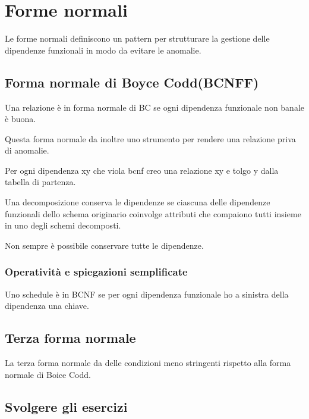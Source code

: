 \section{Forme normali}

Le forme normali definiscono un pattern per strutturare la gestione delle dipendenze funzionali in modo da evitare le anomalie.

\subsection{Forma normale di Boyce Codd(BCNFF)}

Una relazione è in forma normale di BC se ogni dipendenza funzionale non banale è buona.

Questa forma normale da inoltre uno strumento per rendere una relazione priva di anomalie.

Per ogni dipendenza xy che viola bcnf creo una relazione xy e tolgo y dalla tabella di partenza.

Una decomposizione conserva le dipendenze se ciascuna delle dipendenze funzionali dello schema originario coinvolge attributi che compaiono tutti insieme in uno degli schemi decomposti.

Non sempre è possibile conservare tutte le dipendenze.

\subsubsection{Operatività e spiegazioni semplificate}

Uno schedule è in BCNF se per ogni dipendenza funzionale ho a sinistra della dipendenza una chiave.

\subsection{Terza forma normale}

La terza forma normale da delle condizioni meno stringenti rispetto alla forma normale di Boice Codd.

\subsection{Svolgere gli esercizi}


